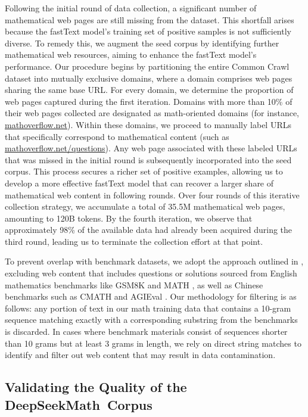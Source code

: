 \begin{itemize}[topsep=0pt]
Following the initial round of data collection, a significant number of mathematical web pages are still missing from the dataset. This shortfall arises because the fastText model’s training set of positive samples is not sufficiently diverse. To remedy this, we augment the seed corpus by identifying further mathematical web resources, aiming to enhance the fastText model’s performance. Our procedure begins by partitioning the entire Common Crawl dataset into mutually exclusive domains, where a domain comprises web pages sharing the same base URL. For every domain, we determine the proportion of web pages captured during the first iteration. Domains with more than 10\% of their web pages collected are designated as math-oriented domains (for instance, \url{mathoverflow.net}). 
Within these domains, we proceed to manually label URLs that specifically correspond to mathematical content (such as \url{mathoverflow.net/questions}). Any web page associated with these labeled URLs that was missed in the initial round is subsequently incorporated into the seed corpus. This process secures a richer set of positive examples, allowing us to develop a more effective fastText model that can recover a larger share of mathematical web content in following rounds. Over four rounds of this iterative collection strategy, we accumulate a total of 35.5M mathematical web pages, amounting to 120B tokens. By the fourth iteration, we observe that approximately 98\% of the available data had already been acquired during the third round, leading us to terminate the collection effort at that point.

To prevent overlap with benchmark datasets, we adopt the approach outlined in \cite{deepseek-coder}, excluding web content that includes questions or solutions sourced from English mathematics benchmarks like GSM8K \citep{gsm8k} and MATH \citep{MATH}, as well as Chinese benchmarks such as CMATH \citep{wei2023cmath} and AGIEval \citep{agieval}. Our methodology for filtering is as follows: any portion of text in our math training data that contains a 10-gram sequence matching exactly with a corresponding substring from the benchmarks is discarded. In cases where benchmark materials consist of sequences shorter than 10 grams but at least 3 grams in length, we rely on direct string matches to identify and filter out web content that may result in data contamination.

\subsection{Validating the Quality of the DeepSeekMath~Corpus}


\end{itemize}
